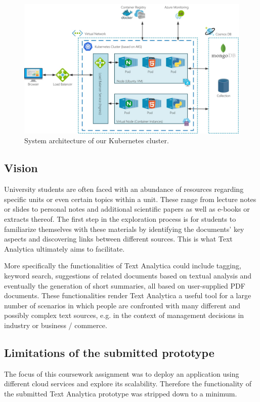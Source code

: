 \documentclass[conference]{IEEEtran}
\begin{document}
\begin{figure}[ht!]
\includegraphics[width=150mm]{img/architecture.jpeg}
\caption{System architecture of our Kubernetes cluster.}
\label{img:architecture}
\end{figure}

\subsection{Vision}
University students are often faced with an abundance of resources regarding specific units or even certain topics within a unit. These range from lecture notes or slides to personal notes and additional scientific papers as well as e-books or extracts thereof. The first step in the exploration process is for students to familiarize themselves with these materials by identifying the documents’ key aspects and discovering links between different sources. This is what Text Analytica ultimately aims to facilitate.

More specifically the functionalities of Text Analytica could include tagging, keyword search, suggestions of related documents based on textual analysis and eventually the generation of short summaries, all based on user-supplied PDF documents. These functionalities render Text Analytica a useful tool for a large number of scenarios in which people are confronted with many different and possibly complex text sources, e.g. in the context of management decisions in industry or business / commerce.

\subsection{Limitations of the submitted prototype}
\label{subsec:limits}
The focus of this coursework assignment was to deploy an application using different cloud services and explore its scalability. Therefore the functionality of the submitted Text Analytica prototype was stripped down to a minimum.
\end{document}
